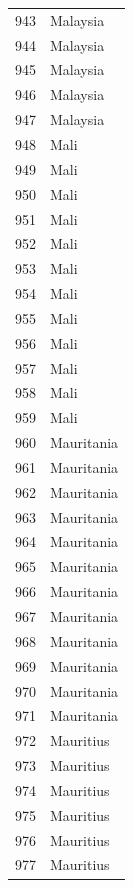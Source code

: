 \documentclass[
  letterpaper,
  DIV=11,
  numbers=noendperiod]{scrreprt}
\begin{document}
\begin{tabular}{ll}
943  &                  Malaysia \\
944  &                  Malaysia \\
945  &                  Malaysia \\
946  &                  Malaysia \\
947  &                  Malaysia \\
948  &                      Mali \\
949  &                      Mali \\
950  &                      Mali \\
951  &                      Mali \\
952  &                      Mali \\
953  &                      Mali \\
954  &                      Mali \\
955  &                      Mali \\
956  &                      Mali \\
957  &                      Mali \\
958  &                      Mali \\
959  &                      Mali \\
960  &                Mauritania \\
961  &                Mauritania \\
962  &                Mauritania \\
963  &                Mauritania \\
964  &                Mauritania \\
965  &                Mauritania \\
966  &                Mauritania \\
967  &                Mauritania \\
968  &                Mauritania \\
969  &                Mauritania \\
970  &                Mauritania \\
971  &                Mauritania \\
972  &                 Mauritius \\
973  &                 Mauritius \\
974  &                 Mauritius \\
975  &                 Mauritius \\
976  &                 Mauritius \\
977  &                 Mauritius \\

\end{tabular}
\end{document}
